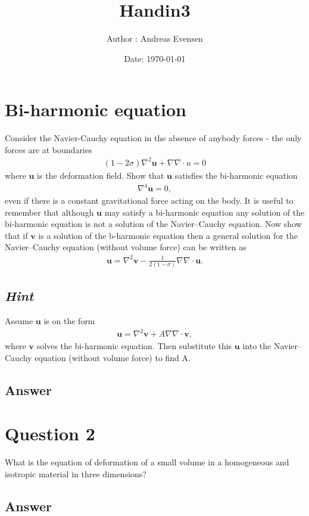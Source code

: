 \documentclass{article}
\title{Handin3}
\author{Author : Andreas Evensen}
\date{Date: \today}
\newcommand{\laplace}{\nabla^2}
\begin{document}
\maketitle
\section{Bi-harmonic equation}
Consider the Navier-Cauchy equation in the absence of anybody forces - the only forces are at boundaries
\begin{align*}
    (1-2\sigma)\laplace\mathbf{u} + \nabla\nabla\cdot u = 0
\end{align*}where $\mathbf{u}$ is the deformation field. Show that $\mathbf{u}$ satisfies the bi-harmonic equation
\begin{align*}
    \nabla^4\mathbf{u} = 0,
\end{align*}even if there is a constant gravitational force acting on the body. It is useful to remember that although
$\mathbf{u}$ may satisfy a bi-harmonic equation any solution of the bi-harmonic equation is not a solution of the Navier–Cauchy equation.
Now show that if $\mathbf{v}$ is a solution of the b-harmonic equation then a general solution for the Navier–Cauchy equation (without volume force) can be written as
\begin{align*}
    \mathbf{u} = \laplace\mathbf{v} -\frac{1}{2(1-\sigma)}\nabla\nabla\cdot\mathbf{u}.
\end{align*}
\subsection*{\textit{Hint}}
Assume $\mathbf{u}$ is on the form
\begin{align*}
    \mathbf{u} = \laplace\mathbf{v}+ A\nabla\nabla\cdot\mathbf{v},
\end{align*}where $\mathbf{v}$ solves the bi-harmonic equation. Then substitute this $\mathbf{u}$ into the Navier–Cauchy equation (without volume force) to find A.
\subsection*{Answer}

\section*{Question 2}
What is the equation of deformation of a small volume in a homogeneous and isotropic material in three dimensions?

\subsection*{Answer}
\end{document}
